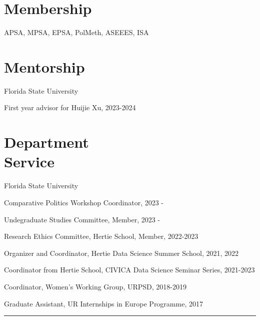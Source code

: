 \documentclass[margin,line,10.95pt]{res}
\newenvironment{list1}{
  \begin{list}{\ding{113}}{%
      \setlength{\itemsep}{0in}
      \setlength{\parsep}{0in} \setlength{\parskip}{0in}
      \setlength{\topsep}{0in} \setlength{\partopsep}{0in}
      \setlength{\leftmargin}{0.17in}}}{\end{list}}
\begin{document}
\begin{resume}
\section{\sc Membership}

APSA, MPSA, EPSA, PolMeth, ASEEES, ISA

\section{\sc Mentorship}

{Florida State University}\\
\vspace*{-.1in}
\begin{list1}
\item[] First year advisor for Huijie Xu, 2023-2024
\end{list1}



\section{\sc Department \\ Service}

{Florida State University}\\
\vspace*{-.1in}
\begin{list1}
\item[] Comparative Politics Workshop Coordinator, 2023 -
\item[] Undegraduate Studies Committee, Member, 2023 -
\end{list1}

Research Ethics Committee, Hertie School, Member, 2022-2023
\vspace*{-4.5mm}

Organizer and Coordinator, Hertie Data Science Summer School, 2021, 2022
\vspace*{-4.5mm}

Coordinator from Hertie School, CIVICA Data Science Seminar Series, 2021-2023
\vspace*{-3.5mm}

Coordinator, Women's Working Group,  URPSD,  2018-2019
\vspace*{-4.5mm}

Graduate Assistant, UR Internships in Europe Programme,  2017

\begin{center}
	\noindent\rule{8cm}{0.4pt}
\end{center}
\vspace{0.5em}


\end{resume}
\end{document}
